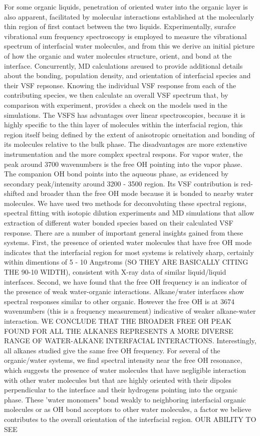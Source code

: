 \documentclass[12pt,reqno]{amsart}
\numberwithin{equation}{section}
\begin{document}
\begin{enumerate}
\subitem For some organic liquids, penetration of oriented water into the organic layer is also apparent, facilitated by molecular interactions established at the molecularly thin region of first contact between the two liquids.  Experimentally, surafce vibrational sum frequency spectroscopy is employed to measure the vibrational spectrum of interfacial water molecules, and from this we derive an initial picture of how the organic and water molecules structure, orient, and bond at the interface.  Concurrently, MD calculations areused to provide additional details about the bonding, population density, and orientation of interfacial species and their VSF repsonse.  Knowing the individual VSF response from each of the contributing species, we then calculate an overall VSF spectrum that, by comparison with experiment, provides a check on the models used in the simulations.  The VSFS has advantages over linear spectroscopies, because it is highly specific to the thin layer of molecules within the interfacial region, this region itself being defined by the extent of anisotropic orneitation and bonding of its molecules relative to the bulk phase.  The disadvantages are more extenstive instrumentation and the more complex spectral respons.  For vapor water, the peak around 3700 wavenumbers is the free OH pointing into the vapor phase.  The companion OH bond points into the aqueous phase, as evidenced by secondary peak/intensity around 3200 - 3500 region.  Its VSF contribution is red-shifted and broader than the free OH mode because it is bonded to nearby water molecules.  We have used two methods for deconvoluting these spectral regions, spectral fitting with isotopic dilution experiments and MD simulations that allow extraction of different water bonded species based on their calculated VSF response.  There are a number of important general insights gained from these systems.  First, the presence of oriented water molecules that have free OH mode indicates that the interfacial region for most systems is relatively sharp, certainly within dimentions of 5 - 10 Angstroms (SO THEY ARE BASICALLY CITING THE 90-10 WIDTH), consistent with X-ray data of similar liquid/liquid interfaces.  Second, we have found that the free OH frequency is an indicator of the presence of weak water-organic interactions.  Alkane/water interfaces show spectral responses similar to other organic.  However the free OH is at 3674 wavenumbers (this is a frequency measurement) indicative of weaker alkane-water interaction.  WE CONCLUDE THAT THE BROADER FREE OH PEAK FOUND FOR ALL THE ALKANES REPRESENTS A MORE DIVERSE RANGE OF WATER-ALKANE INTERFACIAL INTERACTIONS.  Interestingly, all alkanes studied give the same free OH frequency.  For several of the organic/water systems, we find spectral intensity near the free OH resonance, which suggests the presence of water molecules that have negligible interaction with other water molecules but that are highly oriented with their dipoles perpendicular to the interface and their hydrogens pointing into the organic phase.  These 'water monomers" bond weakly to neighboring interfacial organic molecules or as OH bond acceptors to other water molecules, a factor we believe contributes to the overall orientation of the interfacial region.  OUR ABILITY TO SEE 
\end{enumerate}
\end{document}
